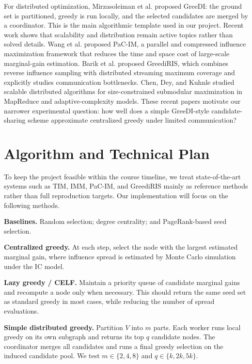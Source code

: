 \documentclass[10pt]{article}
\begin{document}
For distributed optimization, Mirzasoleiman et al. \cite{mirzasoleiman2013distributed} proposed GreeDI: the ground set is partitioned, greedy is run locally, and the selected candidates are merged by a coordinator. This is the main algorithmic template used in our project. Recent work shows that scalability and distribution remain active topics rather than solved details. Wang et al. \cite{wang2023fast} proposed PaC-IM, a parallel and compressed influence maximization framework that reduces the time and space cost of large-scale marginal-gain estimation. Barik et al. \cite{barik2025greediris} proposed GreediRIS, which combines reverse influence sampling with distributed streaming maximum coverage and explicitly studies communication bottlenecks. Chen, Dey, and Kuhnle \cite{chen2024scalable} studied scalable distributed algorithms for size-constrained submodular maximization in MapReduce and adaptive-complexity models. These recent papers motivate our narrower experimental question: how well does a simple GreeDI-style candidate-sharing scheme approximate centralized greedy under limited communication?

\section{Algorithm and Technical Plan}
To keep the project feasible within the course timeline, we treat state-of-the-art systems such as TIM, IMM, PaC-IM, and GreediRIS mainly as reference methods rather than full reproduction targets. Our implementation will focus on the following methods.

\textbf{Baselines.} Random selection; degree centrality; and PageRank-based seed selection.

\textbf{Centralized greedy.} At each step, select the node with the largest estimated marginal gain, where influence spread is estimated by Monte Carlo simulation under the IC model.

\textbf{Lazy greedy / CELF.} Maintain a priority queue of candidate marginal gains and recompute a node only when necessary. This should return the same seed set as standard greedy in most cases, while reducing the number of spread evaluations.

\textbf{Simple distributed greedy.} Partition $V$ into $m$ parts. Each worker runs local greedy on its own subgraph and returns its top $q$ candidate nodes. The coordinator merges all candidates and runs a final greedy selection on the induced candidate pool. We test $m\in\{2,4,8\}$ and $q\in\{k,2k,5k\}$.
\end{document}
